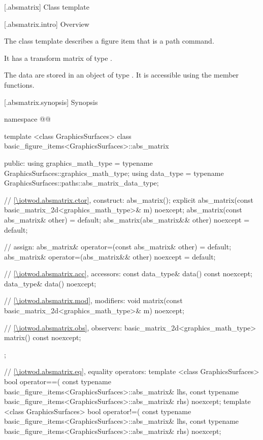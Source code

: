  [\iotwod.absmatrix] {Class template }

 [\iotwod.absmatrix.intro] {Overview}

\pnum
{}%
The class template  describes a figure item that is a path command.

\pnum
It has a transform matrix of type .

\pnum
The data are stored in an object of type . It is accessible using the  member functions.

 [\iotwod.absmatrix.synopsis] {Synopsis}
\begin{codeblock}
namespace @\fullnamespace{}@ {
  template <class GraphicsSurfaces>
  class basic_figure_items<GraphicsSurfaces>::abs_matrix {
  public:
    using graphics_math_type = typename GraphicsSurfaces::graphics_math_type;
    using data_type =
      typename GraphicsSurfaces::paths::abs_matrix_data_type;

    // \ref{\iotwod.absmatrix.ctor}, construct:
    abs_matrix();
    explicit abs_matrix(const basic_matrix_2d<graphics_math_type>& m) noexcept;
    abs_matrix(const abs_matrix& other) = default;
    abs_matrix(abs_matrix&& other) noexcept = default;

    // assign:
    abs_matrix& operator=(const abs_matrix& other) = default;
    abs_matrix& operator=(abs_matrix&& other) noexcept = default;

    // \ref{\iotwod.absmatrix.acc}, accessors:
    const data_type& data() const noexcept;
    data_type& data() noexcept;

    // \ref{\iotwod.absmatrix.mod}, modifiers:
    void matrix(const basic_matrix_2d<graphics_math_type>& m) noexcept;

    // \ref{\iotwod.absmatrix.obs}, observers:
    basic_matrix_2d<graphics_math_type> matrix() const noexcept;
  };
  
  // \ref{\iotwod.absmatrix.eq}, equality operators:
  template <class GraphicsSurfaces>
  bool operator==(
    const typename basic_figure_items<GraphicsSurfaces>::abs_matrix& lhs,
    const typename basic_figure_items<GraphicsSurfaces>::abs_matrix& rhs) 
    noexcept;  
  template <class GraphicsSurfaces>
  bool operator!=(
    const typename basic_figure_items<GraphicsSurfaces>::abs_matrix& lhs,
    const typename basic_figure_items<GraphicsSurfaces>::abs_matrix& rhs) 
    noexcept;  
}
\end{codeblock}


